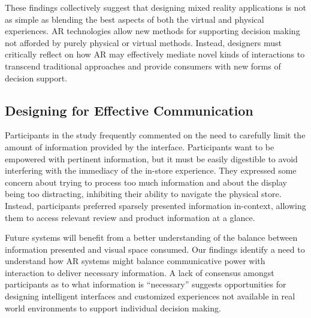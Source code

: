 These findings collectively suggest that designing mixed reality applications is not as simple as blending the best aspects of both the virtual and physical experiences. AR technologies allow new methods for supporting decision making not afforded by purely physical or virtual methods. Instead, designers must critically reflect on how AR may effectively mediate novel kinds of interactions to transcend traditional approaches and provide consumers with new forms of decision support. 

\subsection{Designing for Effective Communication}
Participants in the study frequently commented on the need to carefully limit the amount of information provided by the interface. Participants want to be empowered with pertinent information, but it must be easily digestible to avoid interfering with the immediacy of the in-store experience. They expressed some concern about trying to process too much information and about the display being too distracting, inhibiting their ability to navigate the physical store. Instead, participants preferred sparsely presented information in-context, allowing them to access relevant review and product information at a glance. 

Future systems will benefit from a better understanding of the balance between information presented and visual space consumed. Our findings identify a need to understand how AR systems might balance communicative power with interaction to deliver necessary information. A lack of consensus amongst participants as to what information is ``necessary'' suggests opportunities for designing intelligent interfaces and customized experiences not available in real world environments to support individual decision making. 

